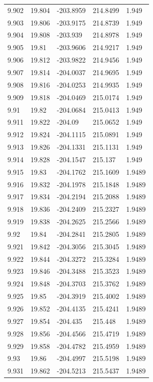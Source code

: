 \begin{tabular}{lllll}
9.902 & 19.804 & -203.8959 & 214.8499 & 1.949 \\
9.903 & 19.806 & -203.9175 & 214.8739 & 1.949 \\
9.904 & 19.808 & -203.939 & 214.8978 & 1.949 \\
9.905 & 19.81 & -203.9606 & 214.9217 & 1.949 \\
9.906 & 19.812 & -203.9822 & 214.9456 & 1.949 \\
9.907 & 19.814 & -204.0037 & 214.9695 & 1.949 \\
9.908 & 19.816 & -204.0253 & 214.9935 & 1.949 \\
9.909 & 19.818 & -204.0469 & 215.0174 & 1.949 \\
9.91 & 19.82 & -204.0684 & 215.0413 & 1.949 \\
9.911 & 19.822 & -204.09 & 215.0652 & 1.949 \\
9.912 & 19.824 & -204.1115 & 215.0891 & 1.949 \\
9.913 & 19.826 & -204.1331 & 215.1131 & 1.949 \\
9.914 & 19.828 & -204.1547 & 215.137 & 1.949 \\
9.915 & 19.83 & -204.1762 & 215.1609 & 1.9489 \\
9.916 & 19.832 & -204.1978 & 215.1848 & 1.9489 \\
9.917 & 19.834 & -204.2194 & 215.2088 & 1.9489 \\
9.918 & 19.836 & -204.2409 & 215.2327 & 1.9489 \\
9.919 & 19.838 & -204.2625 & 215.2566 & 1.9489 \\
9.92 & 19.84 & -204.2841 & 215.2805 & 1.9489 \\
9.921 & 19.842 & -204.3056 & 215.3045 & 1.9489 \\
9.922 & 19.844 & -204.3272 & 215.3284 & 1.9489 \\
9.923 & 19.846 & -204.3488 & 215.3523 & 1.9489 \\
9.924 & 19.848 & -204.3703 & 215.3762 & 1.9489 \\
9.925 & 19.85 & -204.3919 & 215.4002 & 1.9489 \\
9.926 & 19.852 & -204.4135 & 215.4241 & 1.9489 \\
9.927 & 19.854 & -204.435 & 215.448 & 1.9489 \\
9.928 & 19.856 & -204.4566 & 215.4719 & 1.9489 \\
9.929 & 19.858 & -204.4782 & 215.4959 & 1.9489 \\
9.93 & 19.86 & -204.4997 & 215.5198 & 1.9489 \\
9.931 & 19.862 & -204.5213 & 215.5437 & 1.9489 \\

\end{tabular}
